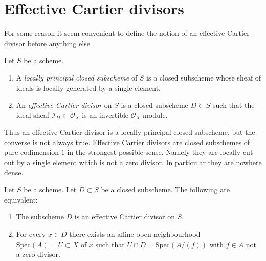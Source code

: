 \section{Effective Cartier divisors}
\label{section-effective-Cartier-divisors}

\noindent
For some reason it seem convenient to define the notion of an effective
Cartier divisor before anything else.

\begin{definition}
\label{definition-effective-Cartier-divisor}
Let $S$ be a scheme.
\begin{enumerate}
\item A {\it locally principal closed subscheme} of $S$ is a closed subscheme
whose sheaf of ideals is locally generated by a single element.
\item An {\it effective Cartier divisor} on $S$ is a closed subscheme
$D \subset S$ such that the ideal sheaf $\mathcal{I}_D \subset \mathcal{O}_X$
is an invertible $\mathcal{O}_X$-module.
\end{enumerate}
\end{definition}

\noindent
Thus an effective Cartier divisor is a locally principal closed subscheme,
but the converse is not always true. Effective Cartier divisors are closed
subschemes of pure codimension $1$ in the strongest possible sense. Namely
they are locally cut out by a single element which is not a zero divisor.
In particular they are nowhere dense.

\begin{lemma}
\label{lemma-characterize-effective-Cartier-divisor}
Let $S$ be a scheme.
Let $D \subset S$ be a closed subscheme.
The following are equivalent:
\begin{enumerate}
\item The subscheme $D$ is an effective Cartier divisor on $S$.
\item For every $x \in D$ there exists an affine open neighbourhood
$\text{Spec}(A) = U \subset X$ of $x$ such that
$U \cap D = \text{Spec}(A/(f))$ with $f \in A$ not a zero divisor.
\end{enumerate}
\end{lemma}

